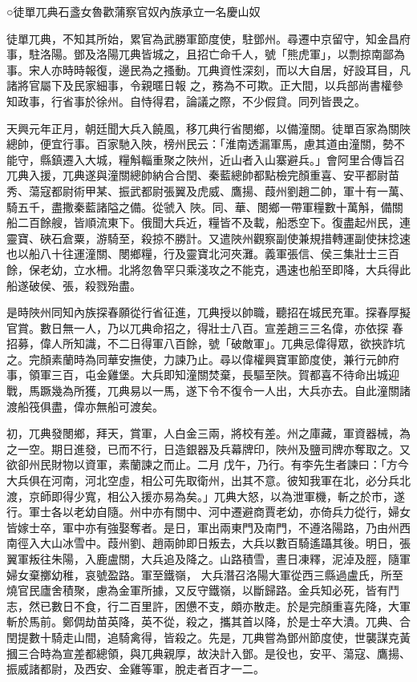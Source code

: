 
\begin{pinyinscope}

 ○徒單兀典石盞女魯歡蒲察官奴內族承立一名慶山奴



 徒單兀典，不知其所始，累官為武勝軍節度使，駐鄧州。尋遷中京留守，知金昌府事，駐洛陽。鄧及洛陽兀典皆城之，且招亡命千人，號「熊虎軍」，以剽掠南鄙為事。宋人亦時時報復，邊民為之搔動。兀典資性深刻，而以大自居，好設耳目，凡諸將官屬下及民家細事，令親暱日報
 之，務為不可欺。正大間，以兵部尚書權參知政事，行省事於徐州。自恃得君，論議之際，不少假貸。同列皆畏之。



 天興元年正月，朝廷聞大兵入饒風，移兀典行省閿鄉，以備潼關。徒單百家為關陜總帥，便宜行事。百家馳入陜，榜州民云：「淮南透漏軍馬，慮其道由潼關，勢不能守，縣鎮遷入大城，糧斛輜重聚之陜州，近山者入山寨避兵。」會阿里合傳旨召兀典入援，兀典遂與潼關總帥納合合閏、秦藍總帥都點檢完顏重喜、安平都尉苗秀、蕩寇都尉術甲某、振武都尉張翼及虎威、鷹揚、葭州劉趙二帥，軍十有一萬、騎五千，盡撒秦藍諸隘之備。從虢入
 陜。同、華、閿鄉一帶軍糧數十萬斛，備關船二百餘艘，皆順流東下。俄聞大兵近，糧皆不及載，船悉空下。復盡起州民，連靈寶、硤石倉粟，游騎至，殺掠不勝計。又遣陜州觀察副使兼規措轉運副使抹捻速也以船八十往運潼關、閿鄉糧，行及靈寶北河夾灘。義軍張信、侯三集壯士三百餘，保老幼，立水柵。北將忽魯罕只乘淺攻之不能克，遇速也船至即降，大兵得此船遂破侯、張，殺戮殆盡。



 是時陜州同知內族探春願從行省征進，兀典授以帥職，聽招在城民充軍。探春厚擬官賞。數日無一人，乃以兀典命招之，得壯士八百。宣差趙三三名偉，亦依探
 春招募，偉人所知識，不二日得軍八百餘，號「破敵軍」。兀典忌偉得眾，欲挾詐坑之。完顏素蘭時為同華安撫使，力諫乃止。尋以偉權興寶軍節度使，兼行元帥府事，領軍三百，屯金雞堡。大兵即知潼關焚棄，長驅至陜。賀都喜不待命出城迎戰，馬蹶幾為所獲，兀典易以一馬，遂下令不復令一人出，大兵亦去。自此潼關諸渡船筏俱盡，偉亦無船可渡矣。



 初，兀典發閿鄉，拜天，賞軍，人白金三兩，將校有差。州之庫藏，軍資器械，為之一空。期日進發，已而不行，日造銀器及兵幕牌印，陜州及鹽司牌亦奪取之。又欲卻州民財物以資軍，素蘭諫之而止。二月
 戊午，乃行。有李先生者諫曰：「方今大兵俱在河南，河北空虛，相公可先取衛州，出其不意。彼知我軍在北，必分兵北渡，京師即得少寬，相公入援亦易為矣。」兀典大怒，以為泄軍機，斬之於市，遂行。軍士各以老幼自隨。州中亦有關中、河中遷避商賈老幼，亦倚兵力從行，婦女皆嫁士卒，軍中亦有強娶奪者。是日，軍出兩東門及南門，不遵洛陽路，乃由州西南徑入大山冰雪中。葭州劉、趙兩帥即日叛去，大兵以數百騎遙躡其後。明日，張翼軍叛往朱陽，入鹿盧關，大兵追及降之。山路積雪，晝日凍釋，泥淖及脛，隨軍婦女棄擲幼稚，哀號盈路。軍至鐵嶺，
 大兵潛召洛陽大軍從西三縣過盧氏，所至燒官民廬舍積聚，慮為金軍所據，又反守鐵嶺，以斷歸路。金兵知必死，皆有鬥志，然已數日不食，行二百里許，困憊不支，頗亦散走。於是完顏重喜先降，大軍斬於馬前。鄭倜劫苗英降，英不從，殺之，攜其首以降，於是士卒大潰。兀典、合閏提數十騎走山間，追騎禽得，皆殺之。先是，兀典嘗為鄧州節度使，世襲謀克黃摑三合時為宣差都總領，與兀典親厚，故決計入鄧。是役也，安平、蕩寇、鷹揚、振威諸都尉，及西安、金雞等軍，脫走者百才一二。




\end{pinyinscope}
